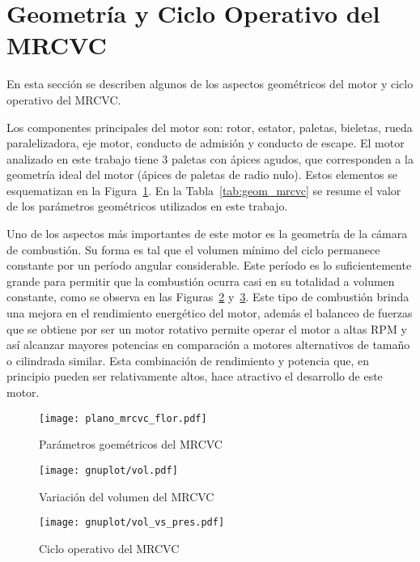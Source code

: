 \section{Geometría y Ciclo Operativo del MRCVC}
%
En esta sección se describen algunos de los aspectos geométricos del motor y
ciclo operativo del MRCVC.

Los componentes principales del motor son: rotor, estator, paletas, bieletas,
rueda paralelizadora, eje motor, conducto de admisión y conducto de escape.
%
El motor analizado en este trabajo tiene 3 paletas con ápices agudos, que
corresponden a la geometría ideal del motor (ápices de paletas de radio nulo).
%
Estos elementos se esquematizan en la Figura~\ref{fig:geom_flor_mrcvc}.
%
En la Tabla~\ref{tab:geom_mrcvc} se resume el valor de los parámetros
geométricos utilizados en este trabajo.

Uno de los aspectos más importantes de este motor es la geometría de la cámara
de combustión.
%
Su forma es tal que el volumen mínimo del ciclo permanece constante por un
período angular considerable. %
%
Este período es lo suficientemente grande para permitir que la combustión
ocurra casi en su totalidad a volumen constante, como se observa en las
Figuras~\ref{fig:mrcvc_vol_cte} y~\ref{fig:PV_mrcvc}.
%
Este tipo de combustión brinda una mejora en el rendimiento energético del
motor, además el balanceo de fuerzas que se obtiene por ser un motor rotativo
permite operar el motor a altas RPM y así alcanzar mayores potencias en
comparación a motores alternativos de tamaño o cilindrada similar.
%
Esta combinación de rendimiento y potencia que, en principio pueden ser
relativamente altos, hace atractivo el desarrollo de este motor.
%

\begin{figure}[ht]
  \centering
  \texttt{[image: plano\_mrcvc\_flor.pdf]}
  \caption{Parámetros goemétricos del MRCVC~\parencite{roldan}}\label{fig:geom_flor_mrcvc}
\end{figure}

\begin{figure}[ht]
  \centering
  \texttt{[image: gnuplot/vol.pdf]}
  \caption{Variación del volumen del MRCVC}\label{fig:mrcvc_vol_cte}
\end{figure}

\begin{figure}[ht]
  \centering
  \texttt{[image: gnuplot/vol\_vs\_pres.pdf]}
  \caption{Ciclo operativo del MRCVC}\label{fig:PV_mrcvc}
\end{figure}

